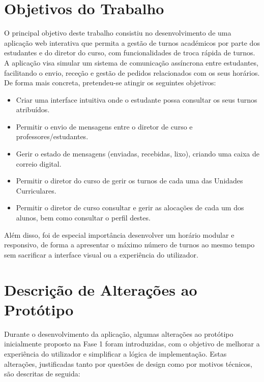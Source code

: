 \documentclass{article}
\begin{document}
\tableofcontents

\newpage
\section{Objetivos do Trabalho}
O principal objetivo deste trabalho consistiu no desenvolvimento de uma aplicação web interativa que permita a gestão de turnos académicos por parte dos estudantes e do diretor do curso, com funcionalidades de troca rápida de turnos. A aplicação visa simular um sistema de comunicação assíncrona entre estudantes, facilitando o envio, receção e gestão de pedidos relacionados com os seus horários.\newline
De forma mais concreta, pretendeu-se atingir os seguintes objetivos:

\begin{itemize}
    \item Criar uma interface intuitiva onde o estudante possa consultar os seus turnos atribuídos.
    \item Permitir o envio de mensagens entre o diretor de curso e professores/estudantes.
    \item Gerir o estado de mensagens (enviadas, recebidas, lixo), criando uma caixa de correio digital.
    \item Permitir o diretor do curso de gerir os turnos de cada uma das Unidades Curriculares.
    \item Permitir o diretor de curso consultar e gerir as alocações de cada um dos alunos, bem como consultar o perfil destes.
\end{itemize}
Além disso, foi de especial importância desenvolver um horário modular e responsivo, de forma a apresentar o máximo número de turnos ao mesmo tempo sem sacrificar a interface visual ou a experiência do utilizador.

\newpage
\section{Descrição de Alterações ao Protótipo}
Durante o desenvolvimento da aplicação, algumas alterações ao protótipo inicialmente proposto na Fase 1 foram introduzidas, com o objetivo de melhorar a experiência do utilizador e simplificar a lógica de implementação. Estas alterações, justificadas tanto por questões de design como por motivos técnicos, são descritas de seguida:
\end{document}
